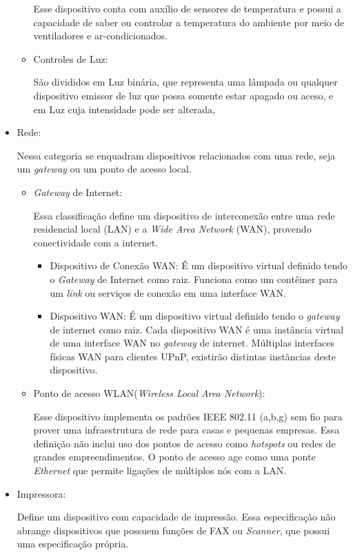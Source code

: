 \begin{itemize}
\begin{itemize}
			Esse dispositivo conta com auxílio de sensores de temperatura e possui a capacidade de saber ou controlar a temperatura do ambiente por meio de ventiladores e ar-condicionados.
		\item Controles de Luz:
			
			São divididos em Luz binária, que representa uma lâmpada ou qualquer dispositivo emissor de luz que possa somente estar apagado ou aceso, e em Luz cuja intensidade pode ser alterada, 
	\end{itemize}

\item Rede:

	Nessa categoria se enquadram dispositivos relacionados com uma rede, seja um \emph{gateway} ou um ponto de acesso local.
	\begin{itemize}
		\item \emph{Gateway} de Internet:
			
			Essa classificação define um dispositivo de interconexão entre uma rede residencial local (LAN) e a \emph{Wide Area Network} (WAN), provendo conectividade com a internet.
			\begin{itemize}
				\item Dispositivo de Conexão WAN: É um dispositivo virtual definido tendo o \emph{Gateway} de Internet como raiz. Funciona como um contêiner para um \emph{link} ou serviços de conexão em uma interface WAN. 
				\item Dispositivo WAN: É um dispositivo virtual definido tendo o \emph{gateway} de internet como raiz. Cada dispositivo WAN é uma instância virtual de uma interface WAN no \emph{gateway} de internet. Múltiplas interfaces físicas WAN para clientes UPnP, existirão distintas instâncias deste dispositivo.
			\end{itemize}

		\item Ponto de acesso WLAN(\emph{Wireless Local Area Network}):
			
			Esse dispositivo implementa os padrões IEEE 802.11 (a,b,g) sem fio para prover uma infraestrutura de rede para casas e pequenas empresas. Essa definição não inclui uso dos pontos de acesso como \emph{hotspots} ou redes de grandes empreendimentos. O ponto de acesso age como uma ponte \emph{Ethernet} que permite ligações de múltiplos nós com a LAN.
	\end{itemize}

\item Impressora:

	Define um dispositivo com capacidade de impressão. Essa especificação não abrange dispositivos que possuem funções de FAX ou \emph{Scanner}, que possui uma especificação própria.


\end{itemize}
